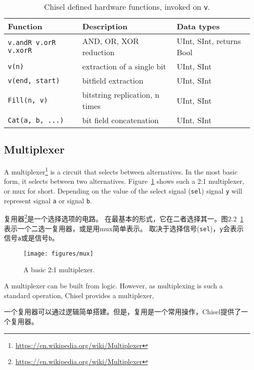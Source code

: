 \documentclass[%
    10pt,
    headinclude, footexclude,
    openright, %
    notitlepage,
    cleardoubleempty,
    headsepline,
    pointlessnumbers,
    bibtotoc, idxtotoc,
    ]{scrbook}
\newcommand{\code}[1]{{\small{\texttt{#1}}}}
\newcommand{\scale}{0.7}
\newcommand{\myref}[2]{\href{#1}{#2}}
\renewcommand{\myref}[2]{{#2}{\footnote{\url{#1}}}}
\begin{document}
\begin{table}
 \centering
 \label{tab:functions}
  \begin{tabular}{lll}
    \toprule
    Function & Description & Data types \\
    \midrule
    \code{v.andR v.orR v.xorR} & AND, OR, XOR reduction & UInt, SInt, returns Bool \\
    \code{v(n)} & extraction of a single bit & UInt, SInt \\
    \code{v(end, start)} & bitfield extraction & UInt, SInt \\
    \code{Fill(n, v)} & bitstring replication, n times & UInt, SInt \\
    \code{Cat(a, b, ...)} & bit field concatenation & UInt, SInt \\
    \bottomrule 
  \end{tabular} 
  \caption{Chisel defined hardware functions, invoked on \code{v}.}
\end{table}                                            
    

\subsection{Multiplexer}

A \myref{https://en.wikipedia.org/wiki/Multiplexer}{multiplexer} is a circuit that selects between alternatives.
In the most basic form, it selects between two alternatives. Figure~\ref{fig:mux} shows
such a 2:1 multiplexer, or mux for short. Depending on the value of the
select signal (\code{sel}) signal \code{y} will represent signal \code{a} or
signal \code{b}.

\myref{https://en.wikipedia.org/wiki/Multiplexer}{复用器}是一个选择选项的电路。
在最基本的形式，它在二者选择其一。图2.2~\ref{fig:mux}表示一个二选一复用器，或是用mux简单表示。
取决于选择信号(\code{sel})，\code{y}会表示信号\code{a}或是信号\code{b}。


\begin{figure}
  \centering
  \texttt{[image: figures/mux]}
  \caption{A basic 2:1 multiplexer.}
  \label{fig:mux}
\end{figure}

A multiplexer can be built from logic.
However, as multiplexing  is such a standard operation, Chisel provides a multiplexer,

一个复用器可以通过逻辑简单搭建。但是，复用是一个常用操作，Chisel提供了一个复用器。

\end{document}
